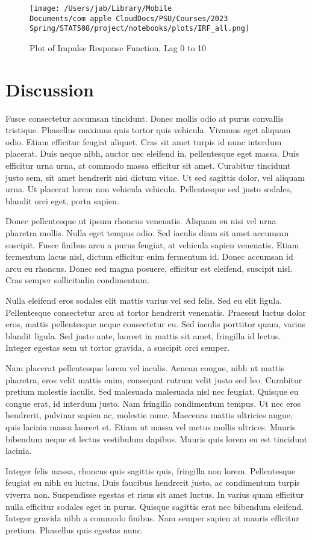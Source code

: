 \documentclass{article}
\begin{document}
\begin{figure}[h]
\centering
  \texttt{[image: /Users/jab/Library/Mobile Documents/com~apple~CloudDocs/PSU/Courses/2023 Spring/STAT508/project/notebooks/plots/IRF\_all.png]}
  \caption{Plot of Impulse Response Function, Lag 0 to 10}
\end{figure}



\hypertarget{discussion}{%
\section{Discussion}\label{discussion}}

Fusce consectetur accumsan tincidunt. Donec mollis odio at purus
convallis tristique. Phasellus maximus quis tortor quis vehicula.
Vivamus eget aliquam odio. Etiam efficitur feugiat aliquet. Cras sit
amet turpis id nunc interdum placerat. Duis neque nibh, auctor nec
eleifend in, pellentesque eget massa. Duis efficitur urna urna, at
commodo massa efficitur sit amet. Curabitur tincidunt justo sem, sit
amet hendrerit nisi dictum vitae. Ut sed sagittis dolor, vel aliquam
urna. Ut placerat lorem non vehicula vehicula. Pellentesque sed justo
sodales, blandit orci eget, porta sapien.

Donec pellentesque ut ipsum rhoncus venenatis. Aliquam eu nisi vel urna
pharetra mollis. Nulla eget tempus odio. Sed iaculis diam sit amet
accumsan suscipit. Fusce finibus arcu a purus feugiat, at vehicula
sapien venenatis. Etiam fermentum lacus nisl, dictum efficitur enim
fermentum id. Donec accumsan id arcu eu rhoncus. Donec sed magna
posuere, efficitur est eleifend, suscipit nisl. Cras semper sollicitudin
condimentum.

Nulla eleifend eros sodales elit mattis varius vel sed felis. Sed eu
elit ligula. Pellentesque consectetur arcu at tortor hendrerit
venenatis. Praesent luctus dolor eros, mattis pellentesque neque
consectetur eu. Sed iaculis porttitor quam, varius blandit ligula. Sed
justo ante, laoreet in mattis sit amet, fringilla id lectus. Integer
egestas sem ut tortor gravida, a suscipit orci semper.

Nam placerat pellentesque lorem vel iaculis. Aenean congue, nibh ut
mattis pharetra, eros velit mattis enim, consequat rutrum velit justo
sed leo. Curabitur pretium molestie iaculis. Sed malesuada malesuada
nisl nec feugiat. Quisque eu congue erat, id interdum justo. Nam
fringilla condimentum tempus. Ut nec eros hendrerit, pulvinar sapien ac,
molestie nunc. Maecenas mattis ultricies augue, quis lacinia massa
laoreet et. Etiam ut massa vel metus mollis ultrices. Mauris bibendum
neque et lectus vestibulum dapibus. Mauris quis lorem eu est tincidunt
lacinia.

Integer felis massa, rhoncus quis sagittis quis, fringilla non lorem.
Pellentesque feugiat eu nibh eu luctus. Duis faucibus hendrerit justo,
ac condimentum turpis viverra non. Suspendisse egestas et risus sit amet
luctus. In varius quam efficitur nulla efficitur sodales eget in purus.
Quisque sagittis erat nec bibendum eleifend. Integer gravida nibh a
commodo finibus. Nam semper sapien at mauris efficitur pretium.
Phasellus quis egestas nunc.


\end{document}

